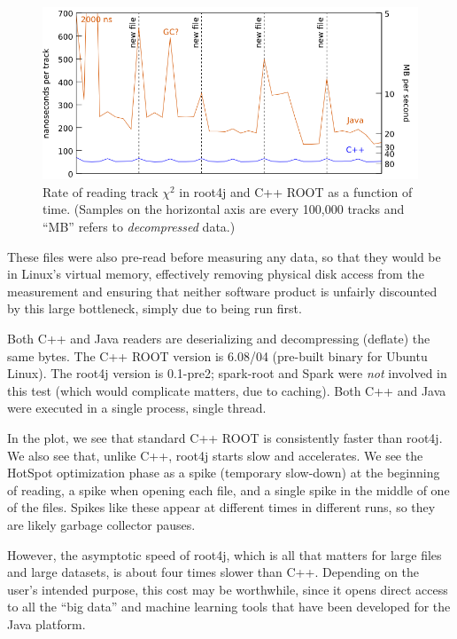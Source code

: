 \documentclass[12pt]{article}
\begin{document}
\begin{figure}[t]
\begin{center}
\includegraphics[width=0.8\linewidth]{root4j_reading_tracks.png}
\end{center}

\caption{\label{root4j_reading_tracks} Rate of reading track $\chi^2$ in root4j and C++ ROOT as a function of time. (Samples on the horizontal axis are every 100,000 tracks and ``MB'' refers to {\it decompressed} data.)}
\end{figure}

These files were also pre-read before measuring any data, so that they would be in Linux's virtual memory, effectively removing physical disk access from the measurement and ensuring that neither software product is unfairly discounted by this large bottleneck, simply due to being run first.

Both C++ and Java readers are deserializing and decompressing (deflate) the same bytes. The C++ ROOT version is 6.08/04 (pre-built binary for Ubuntu Linux). The root4j version is 0.1-pre2; spark-root and Spark were {\it not} involved in this test (which would complicate matters, due to caching). Both C++ and Java were executed in a single process, single thread.

In the plot, we see that standard C++ ROOT is consistently faster than root4j. We also see that, unlike C++, root4j starts slow and accelerates. We see the HotSpot optimization phase as a spike (temporary slow-down) at the beginning of reading, a spike when opening each file, and a single spike in the middle of one of the files. Spikes like these appear at different times in different runs, so they are likely garbage collector pauses.

However, the asymptotic speed of root4j, which is all that matters for large files and large datasets, is about four times slower than C++. Depending on the user's intended purpose, this cost may be worthwhile, since it opens direct access to all the ``big data'' and machine learning tools that have been developed for the Java platform.
\end{document}
